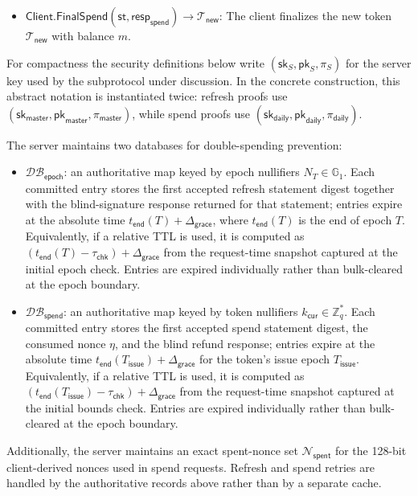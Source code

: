 \documentclass[11pt]{article}
\theoremstyle{definitionstyle}
\theoremstyle{plain}
\newcommand{\DB}{\mathcal{DB}}
\begin{document}
\begin{itemize}[leftmargin=*]
\begin{itemize}
  \item $\mathsf{Client.FinalSpend}(\mathsf{st}, \mathsf{resp}_{\mathsf{spend}}) \to \mathcal{T}_{\mathsf{new}}$: The client finalizes the new token $\mathcal{T}_{\mathsf{new}}$ with balance $m$.
  \end{itemize}
For compactness the security definitions below write $(\mathsf{sk}_S,\mathsf{pk}_S,\pi_S)$ for the server key used by the subprotocol under discussion. In the concrete construction, this abstract notation is instantiated twice: refresh proofs use $(\mathsf{sk}_{\mathsf{master}},\mathsf{pk}_{\mathsf{master}},\pi_{\mathsf{master}})$, while spend proofs use $(\mathsf{sk}_{\mathsf{daily}},\mathsf{pk}_{\mathsf{daily}},\pi_{\mathsf{daily}})$.
\end{itemize}

The server maintains two databases for double-spending prevention:
\begin{itemize}
\item $\DB_{\mathsf{epoch}}$: an authoritative map keyed by epoch nullifiers $N_T \in \mathbb{G}_1$.  Each committed entry stores the first accepted refresh statement digest together with the blind-signature response returned for that statement; entries expire at the absolute time $t_{\mathsf{end}}(T) + \Delta_{\mathsf{grace}}$, where $t_{\mathsf{end}}(T)$ is the end of epoch $T$.  Equivalently, if a relative TTL is used, it is computed as $(t_{\mathsf{end}}(T) - \tau_{\mathsf{chk}}) + \Delta_{\mathsf{grace}}$ from the request-time snapshot captured at the initial epoch check. Entries are expired individually rather than bulk-cleared at the epoch boundary.
\item $\DB_{\mathsf{spend}}$: an authoritative map keyed by token nullifiers $k_{\mathsf{cur}} \in \mathbb{Z}_q^*$.  Each committed entry stores the first accepted spend statement digest, the consumed nonce $\eta$, and the blind refund response; entries expire at the absolute time $t_{\mathsf{end}}(T_{\mathsf{issue}}) + \Delta_{\mathsf{grace}}$ for the token's issue epoch $T_{\mathsf{issue}}$.  Equivalently, if a relative TTL is used, it is computed as $(t_{\mathsf{end}}(T_{\mathsf{issue}}) - \tau_{\mathsf{chk}}) + \Delta_{\mathsf{grace}}$ from the request-time snapshot captured at the initial bounds check. Entries are expired individually rather than bulk-cleared at the epoch boundary.
\end{itemize}
Additionally, the server maintains an exact spent-nonce set $\mathcal{N}_{\mathsf{spent}}$ for the 128-bit client-derived nonces used in spend requests.  Refresh and spend retries are handled by the authoritative records above rather than by a separate cache.
\end{document}
